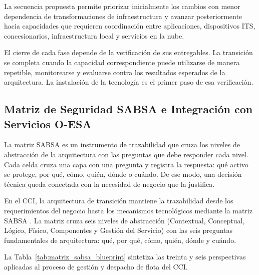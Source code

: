 La secuencia propuesta permite priorizar inicialmente los cambios con menor dependencia de
transformaciones de infraestructura y avanzar posteriormente hacia capacidades que requieren
coordinación entre aplicaciones, dispositivos ITS, concesionarios, infraestructura local y
servicios en la nube.

El cierre de cada fase depende de la verificación de sus entregables. La transición se completa cuando la capacidad correspondiente puede
utilizarse de manera repetible, monitorearse y evaluarse contra los resultados esperados de la
arquitectura. La instalación de la tecnología es el primer paso de esa verificación.


\subsection{Matriz de Seguridad SABSA e Integración con Servicios O-ESA}

La matriz SABSA es un instrumento de trazabilidad que cruza los niveles de abstracción de la arquitectura con las preguntas que debe responder cada nivel. Cada celda cruza una capa con una pregunta y registra la respuesta: qué activo se protege, por qué, cómo, quién, dónde o cuándo. De ese modo, una decisión técnica queda conectada con la necesidad de negocio que la justifica.

En el CCI, la arquitectura de transición mantiene la trazabilidad desde los requerimientos del negocio
hasta los mecanismos tecnológicos mediante la matriz SABSA \parencite{sabsa2005,sabsaCCI2026}. La matriz cruza seis niveles
de abstracción (Contextual, Conceptual, Lógico, Físico, Componentes y Gestión del
Servicio) con las seis preguntas fundamentales de arquitectura: qué, por qué, cómo, quién,
dónde y cuándo.

La Tabla~\ref{tab:matriz_sabsa_blueprint} sintetiza las treinta y seis perspectivas aplicadas al
proceso de gestión y despacho de flota del CCI.

